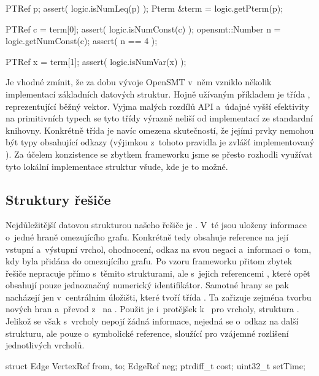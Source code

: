 \begin{code}[label=Příklad práce s~termem p $\approx (4 \leq x)$]
PTRef p;    
assert( logic.isNumLeq(p) );
Pterm &term = logic.getPterm(p);

PTRef c = term[0];
assert( logic.isNumConst(c) );
opensmt::Number n = logic.getNumConst(c);
assert( n == 4 );

PTRef x = term[1];
assert( logic.isNumVar(x) );
\end{code}

Je vhodné zmínit, že za dobu vývoje OpenSMT v~něm vzniklo několik implementací základních datových struktur. Hojně užívaným příkladem je třída , reprezentující běžný vektor. Vyjma malých rozdílů API a~údajné vyšší efektivity na primitivních typech se tyto třídy výrazně neliší od implementací ze standardní knihovny. Konkrétně třída  je navíc omezena skutečností, že jejími prvky nemohou být typy obsahující odkazy (výjimkou z~tohoto pravidla je zvlášť implementovaný ). Za účelem konzistence se zbytkem frameworku jsme se přesto rozhodli využívat tyto lokální implementace struktur všude, kde je to možné. 

\subsection*{Struktury řešiče}
Nejdůležitější datovou strukturou našeho řešiče je . V~té jsou uloženy informace o~jedné hraně omezujícího grafu. Konkrétně tedy obsahuje reference na její vstupní a~výstupní vrchol, ohodnocení, odkaz na svou negaci a~informaci o~tom, kdy byla přidána do omezujícího grafu. Po vzoru frameworku přitom zbytek řešiče nepracuje přímo s~těmito strukturami, ale s~jejich referencemi , které opět obsahují pouze jednoznačný numerický identifikátor. Samotné hrany se pak nacházejí jen v~centrálním úložišti, které tvoří třída . Ta zařizuje zejména tvorbu nových hran a~převod z~ na . Použit je i~protějšek k~ pro vrcholy, struktura . Jelikož se však s~vrcholy nepojí žádná informace, nejedná se o~odkaz na další strukturu, ale pouze o~symbolické reference, sloužící pro vzájemné rozlišení jednotlivých vrcholů.

\begin{code}[label=Deklarace struktury Edge]
struct Edge {
    VertexRef from, to;    
    EdgeRef neg;           
    ptrdiff_t cost;
    uint32_t setTime;
}
\end{code}


